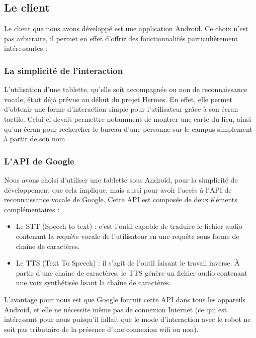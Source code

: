 \documentclass[a4paper,10pt]{report}
\begin{document}
    \subsection{Le client}
    {Le client que nous avons développé est une application Android. Ce choix n'est
    pas arbitraire, il permet en effet d'offrir des fonctionnalités particulièrement
    intéressantes :}

    \subsubsection{La simplicité de l'interaction}
    {L'utilisation d'une tablette, qu'elle soit accompagnée ou non de reconnaissance
    vocale, était déjà prévue au début du projet Hermes. En effet, elle permet
    d'obtenir une forme d'interaction simple pour l'utilisateur grâce à son écran tactile.
    Celui ci devait permettre notamment de montrer une carte du lieu, ainsi qu'un écran
    pour rechercher le bureau d'une personne sur le campus simplement à partir de son
    nom.}

    \subsubsection{L'API de Google}
    {Nous avons choisi d'utiliser une tablette sous Android, pour la simplicité de
    développement que cela implique, mais aussi pour avoir l'accès à l'API de reconnaissance
    vocale de Google. Cette API est composée de deux éléments complémentaires :}
    \begin{itemize}
      \item Le STT (Speech to text) : c'est l'outil capable de traduire le fichier
      audio contenant la requête vocale de l'utilisateur en une requête sous forme de
      chaîne de caractères.
      \item Le TTS (Text To Speech) : il s'agit de l'outil faisant le travail inverse.
      À partir d'une chaîne de caractères, le TTS génère un fichier audio contenant une
      voix synthétisée lisant la chaîne de caractères.
    \end{itemize}

    {L'avantage pour nous est que Google fournit cette API dans tous les appareils
    Android, et elle ne nécessite même pas de connexion Internet (ce qui est intéressant
    pour nous puisqu'il fallait que le mode d'interaction avec le robot ne soit pas
    tributaire de la présence d'une connexion wifi ou non).}
\end{document}
